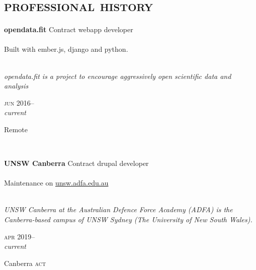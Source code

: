 
\vspace{-0.6cm}
\section*{\textsc{professional history}}
\vspace{-0.2cm}


\begin{minipage}[t]{\mainboxwidth\textwidth}
\textbf{opendata.fit}\phantom{..} Contract webapp developer\\
\\
Built with ember.js, django and python.\\
\\
{\small
\textit{opendata.fit is a project to encourage aggressively open scientific data and
analysis} 
\par}
\end{minipage}
\begin{minipage}[t]{\detailboxwidth\textwidth}
{
\hfill \textsc{jun} 2016--\\ 
\hspace*{0pt} \hfill \textit{current}
\par
{\small\hfill Remote}
}
\end{minipage}
\\

\begin{minipage}[t]{\mainboxwidth\textwidth}
\textbf{UNSW Canberra}\phantom{..} Contract drupal developer\\
\\
Maintenance on \href{https://unsw.adfa.edu.au/}{unsw.adfa.edu.au} \\
\\
{\small
\textit{UNSW Canberra at the Australian Defence Force Academy (ADFA) is the Canberra-based campus of UNSW Sydney (The University of New South Wales).} 
\par}
\end{minipage}
\begin{minipage}[t]{\detailboxwidth\textwidth}
{
\hfill \textsc{apr} 2019--\\ 
\hspace*{0pt} \hfill \textit{current}
\par
{\small\hfill Canberra \textsc{act}}
}
\end{minipage}
\\

